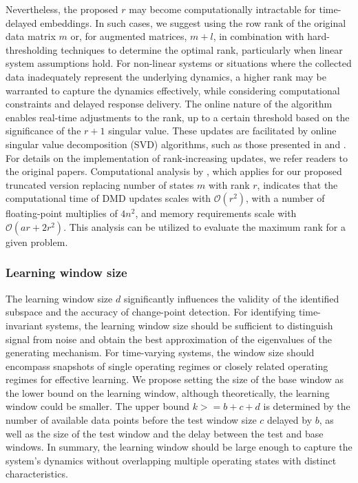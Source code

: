 Nevertheless, the proposed \( r \) may become computationally intractable for time-delayed embeddings. In such cases, we suggest using the row rank of the original data matrix \( m \) or, for augmented matrices, \( m + l \), in combination with hard-thresholding techniques to determine the optimal rank, particularly when linear system assumptions hold. For non-linear systems or situations where the collected data inadequately represent the underlying dynamics, a higher rank may be warranted to capture the dynamics effectively, while considering computational constraints and delayed response delivery. The online nature of the algorithm enables real-time adjustments to the rank, up to a certain threshold based on the significance of the \(r + 1\) singular value. These updates are facilitated by online singular value decomposition (SVD) algorithms, such as those presented in \cite{Brand2006} and \cite{Zhang2022}. For details on the implementation of rank-increasing updates, we refer readers to the original papers. Computational analysis by \cite{Zhang2019}, which applies for our proposed truncated version replacing number of states \(m\) with rank \(r\), indicates that the computational time of DMD updates scales with \( \mathcal{O}(r^2) \), with a number of floating-point multiplies of \(4n^2\), and memory requirements scale with \( \mathcal{O}(a r + 2 r ^ 2) \). This analysis can be utilized to evaluate the maximum rank for a given problem.

\subsubsection{Learning window size}
The learning window size \(d\) significantly influences the validity of the identified subspace and the accuracy of change-point detection. For identifying time-invariant systems, the learning window size should be sufficient to distinguish signal from noise and obtain the best approximation of the eigenvalues of the generating mechanism. For time-varying systems, the window size should encompass snapshots of single operating regimes or closely related operating regimes for effective learning. We propose setting the size of the base window as the lower bound on the learning window, although theoretically, the learning window could be smaller. The upper bound \(k >= b + c + d\) is determined by the number of available data points before the test window size \(c\) delayed by \(b\), as well as the size of the test window and the delay between the test and base windows. In summary, the learning window should be large enough to capture the system's dynamics without overlapping multiple operating states with distinct characteristics.

